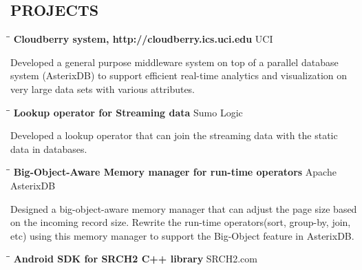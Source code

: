 \documentclass{res}
\begin{document}
\begin{resume}
\section{PROJECTS}
   \vspace{-0.1in}
   \begin{tabbing}
   \hspace{2in}\= \hspace{3in}\= \kill %
   {\bf Cloudberry system, http://cloudberry.ics.uci.edu}\>  \>UCI\\
   \end{tabbing}\vspace{-30pt}      %
   Developed a general purpose middleware system on top of a parallel database system (AsterixDB) to support efficient real-time analytics and visualization on very large data sets with various attributes.
   \vspace{-0.1in}
   \begin{tabbing}
   \hspace{2in}\= \hspace{3in}\= \kill %
    {\bf Lookup operator for Streaming data}\>  \>Sumo Logic\\
   \end{tabbing}\vspace{-30pt}      %
   Developed a lookup operator that can join the streaming data with the static data in databases.
   \vspace{-0.1in}
   \begin{tabbing}
   \hspace{2in}\= \hspace{3in}\= \kill %
    {\bf Big-Object-Aware Memory manager for run-time operators }\>  \>Apache AsterixDB\\
   \end{tabbing}\vspace{-30pt}      %
   Designed a big-object-aware memory manager that can adjust the page size based on the incoming record size.
   Rewrite the run-time operators(sort, group-by, join, etc) using this memory manager to support the Big-Object feature in AsterixDB.
   \vspace{-0.1in}
   \begin{tabbing}
   \hspace{2in}\= \hspace{3in}\= \kill %
    {\bf Android SDK for SRCH2 C++ library }\>  \>SRCH2.com\\

\end{tabbing}
\end{resume}
\end{document}
